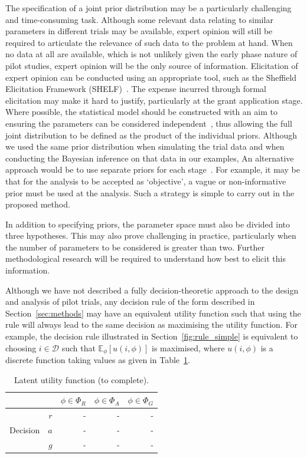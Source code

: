 \documentclass{article} %
\begin{document}
The specification of a joint prior distribution may be a particularly challenging and time-consuming task. Although some relevant data relating to similar parameters in different trials may be available, expert opinion will still be required to articulate the relevance of such data to the problem at hand. When no data at all are available, which is not unlikely given the early phase nature of pilot studies, expert opinion will be the only source of information. Elicitation of expert opinion can be conducted using an appropriate tool, such as the Sheffield Elicitation Framework (SHELF)~\cite{OHagan2006a}. The expense incurred through formal elicitation may make it hard to justify, particularly at the grant application stage. Where possible, the statistical model should be constructed with an aim to ensuring the parameters can be considered independent~\cite{OHagan2012}, thus allowing the full joint distribution to be defined as the product of the individual priors.  Although we used the same prior distribution when simulating the trial data and when conducting the Bayesian inference on that data in our examples, An alternative approach would be to use separate priors for each stage~\cite{Wang2002}. For example, it may be that for the analysis to be accepted as `objective', a vague or non-informative prior must be used at the analysis. Such a strategy is simple to carry out in the proposed method.

In addition to specifying priors, the parameter space must also be divided into three hypotheses. This may also prove challenging in practice, particularly when the number of parameters to be considered is greater than two. Further methodological research will be required to understand how best to elicit this information.

Although we have not described a fully decision-theoretic approach to the design and analysis of pilot trials, any decision rule of the form described in Section~\ref{sec:methods} may have an equivalent utility function such that using the rule will always lead to the same decision as maximising the utility function. For example, the decision rule illustrated in Section~\ref{fig:rule_simple} is equivalent to choosing $i \in \mathcal{D}$ such that $\mathbb{E}_{\phi}[u(i, \phi)]$ is maximised, where $u(i, \phi)$ is a discrete function taking values as given in Table~\ref{tab:utility}.

\begin{table}
\centering
\begin{tabular}{r r r r r}
\toprule
& & $\phi \in \Phi_{R}$ & $\phi \in \Phi_{A}$ & $\phi \in \Phi_{G}$ \\
\midrule
\multirow{3}{*}{Decision} & $r$ & - & - & - \\
 & $a$ & - & - & - \\
 & $g$ & - & - & - \\
\bottomrule
\end{tabular}
\caption{Latent utility function (to complete).}
\label{tab:utility}
\end{table}
\end{document}
